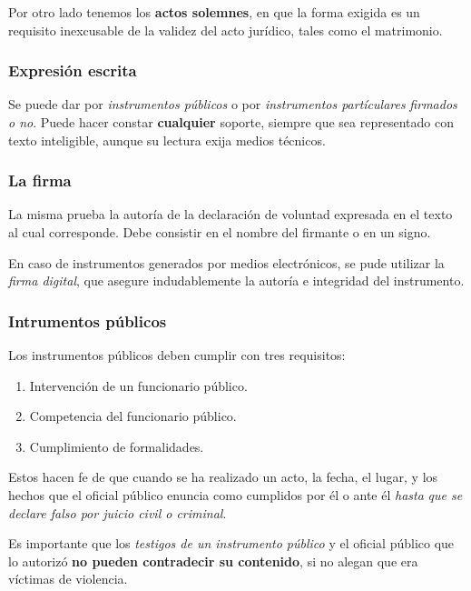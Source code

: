 \documentclass[../resumen.tex]{subfiles}
\begin{document}
Por otro lado tenemos los \textbf{actos solemnes}, en que la forma exigida es 
un requisito inexcusable de la validez del acto jurídico, tales como el matrimonio.

\subsubsection{Expresión escrita}

Se puede dar por \textit{instrumentos públicos} o por \textit{instrumentos partículares}
\textit{firmados o no}. Puede hacer constar \textbf{cualquier} soporte, siempre
que sea representado con texto inteligible, aunque su lectura exija medios técnicos.

\subsubsection{La firma}

La misma prueba la autoría de la declaración de voluntad expresada en el texto al
cual corresponde. Debe consistir en el nombre del firmante o en un signo.

En caso de instrumentos generados por medios electrónicos, se pude utilizar la
\textit{firma digital}, que asegure indudablemente la autoría e integridad del
instrumento.

\subsubsection{Intrumentos públicos}

Los instrumentos públicos deben cumplir con tres requisitos: 

\begin{enumerate}
  \item Intervención de un funcionario público.
  \item Competencia del funcionario público.
  \item Cumplimiento de formalidades.
\end{enumerate}

Estos hacen fe de que cuando se ha realizado un acto, la fecha, el lugar, y los
hechos que el oficial público enuncia como cumplidos por él o ante él \textit{hasta}
\textit{que se declare falso por juicio civil o criminal}.

Es importante que los \textit{testigos de un instrumento público} y el oficial
público que lo autorizó \textbf{no pueden contradecir su contenido}, si no alegan
que era víctimas de violencia.
\end{document}
